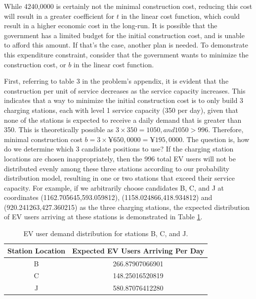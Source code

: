 \documentclass[10pt]{article}
\begin{document}
While 4240,0000 is certainly not the minimal construction cost, reducing this cost will result in a greater coefficient for $t$ in the linear cost function, which could result in a higher economic cost in the long-run. It is possible that the government has a limited budget for the initial construction cost, and is unable to afford this amount. If that's the case, another plan is needed. To demonstrate this expenditure constraint, consider that the government wants to minimize the construction cost, or $b$ in the linear cost function.

First, referring to table 3 in the problem's appendix, it is evident that the construction per unit of service decreases as the service capacity increases. This indicates that a way to minimize the initial construction cost is to only build 3 charging stations, each with level 1 service capacity (350 per day), given that none of the stations is expected to receive a daily demand that is greater than 350. This is theoretically possible as $3 \times 350 = 1050, and 1050 > 996.$ Therefore, minimal construction cost $b = 3 \times \text{¥}650,0000 = \text{¥}195,0000.$ The question is, how do we determine which 3 candidate positions to use? If the charging station locations are chosen inappropriately, then the 996 total EV users will not be distributed evenly among these three stations according to our probability distribution model, resulting in one or two stations that exceed their service capacity. For example, if we arbitrarily choose candidates B, C, and J at coordinates (1162.705645,593.059812), (1158.024866,418.934812) and (920.241263,427.360215) as the three charging stations, the expected distribution of EV users arriving at these stations is demonstrated in Table \ref{tab:dist_bad_example}. 

{\renewcommand{\arraystretch}{1.9}%
\begin{table}[htbp]
    \centering
    \begin{tabular}{c|c}
        Station Location & Expected EV Users Arriving Per Day \\
        \hline
        B & 266.87907066901 \\
        \hline
        C & 148.25016520819 \\
        \hline
        J & 580.87076412280\\
    \end{tabular}
    \caption{EV user demand distribution for stations B, C, and J.}
    \label{tab:dist_bad_example}
\end{table}}
\end{document}
